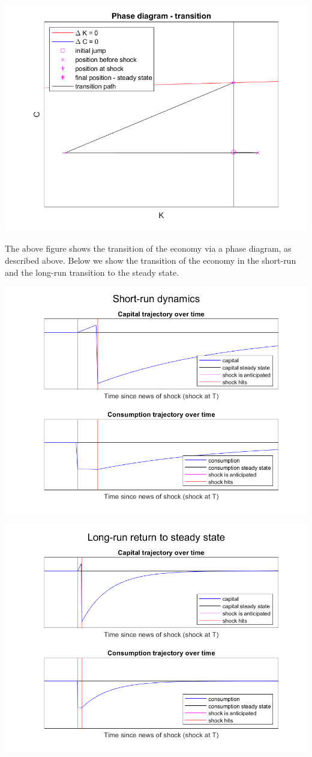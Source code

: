 \documentclass[11pt]{article} %
\begin{document}
 \includegraphics{phtrnolab}

The above figure shows the transition of the economy via a phase diagram, as described above. Below we show the transition of the economy in the short-run and the long-run transition to the steady state.

\includegraphics{shortrunnolab}

\includegraphics{longrunnolab}
\end{document}
